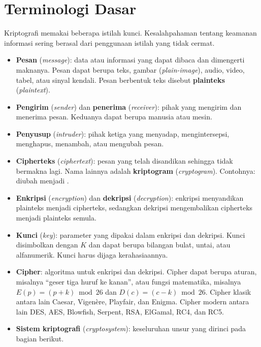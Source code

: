 \section{Terminologi Dasar}
\label{sec:terminologi}

Kriptografi memakai beberapa istilah kunci. Kesalahpahaman tentang keamanan
informasi sering berasal dari penggunaan istilah yang tidak cermat.

\begin{itemize}
    \item \textbf{Pesan} (\textit{message}): data atau informasi yang dapat
          dibaca dan dimengerti maknanya. Pesan dapat berupa teks, gambar
          (\textit{plain-image}), audio, video, tabel, atau sinyal kendali.
          Pesan berbentuk teks disebut \textbf{plainteks} (\textit{plaintext}).
    \item \textbf{Pengirim} (\textit{sender}) dan \textbf{penerima}
          (\textit{receiver}): pihak yang mengirim dan menerima pesan. Keduanya
          dapat berupa manusia atau mesin.
    \item \textbf{Penyusup} (\textit{intruder}): pihak ketiga yang menyadap,
          mengintersepsi, menghapus, menambah, atau mengubah pesan.
    \item \textbf{Cipherteks} (\textit{ciphertext}): pesan yang telah disandikan
          sehingga tidak bermakna lagi. Nama lainnya adalah \textbf{kriptogram}
          (\textit{cryptogram}). Contohnya:
           diubah menjadi
          \code{t\^{}\$gfUi89rewoFpfdWqLMp[uTcxZ}.
    \item \textbf{Enkripsi} (\textit{encryption}) dan \textbf{dekripsi}
          (\textit{decryption}): enkripsi menyandikan plainteks menjadi
          cipherteks, sedangkan dekripsi mengembalikan cipherteks menjadi
          plainteks semula.
    \item \textbf{Kunci} (\textit{key}): parameter yang dipakai dalam enkripsi
          dan dekripsi. Kunci disimbolkan dengan $K$ dan dapat berupa bilangan
          bulat, untai, atau alfanumerik. Kunci harus dijaga kerahasiaannya.
    \item \textbf{Cipher}: algoritma untuk enkripsi dan dekripsi. Cipher dapat
          berupa aturan, misalnya ``geser tiga huruf ke kanan'', atau fungsi
          matematika, misalnya $E(p) = (p + k) \bmod 26$ dan
          $D(c) = (c - k) \bmod 26$. Cipher klasik antara lain Caesar,
          Vigen\`ere, Playfair, dan Enigma. Cipher modern antara lain DES, AES,
          Blowfish, Serpent, RSA, ElGamal, RC4, dan RC5.
    \item \textbf{Sistem kriptografi} (\textit{cryptosystem}): keseluruhan
          unsur yang dirinci pada bagian berikut.
\end{itemize}

